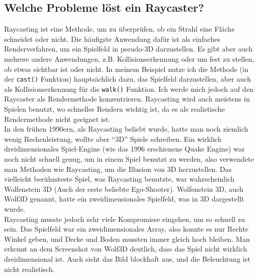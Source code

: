 \documentclass[a4paper,12pt]{report}
\begin{document}
\subsection{Welche Probleme löst ein Raycaster?}
Raycasting ist eine Methode, um zu überprüfen, ob ein Strahl eine Fläche schneidet oder nicht. Die häufigste Anwendung dafür ist als einfaches Renderverfahren, um ein Spielfeld in pseudo-3D darzustellen. Es gibt aber auch mehrere andere Anwendungen, z.B. Kollisionserkennung oder um fest zu stellen, ob etwas sichtbar ist oder nicht. In meinem Beispiel nutze ich die Methode (in der \texttt{cast()} Funktion) hauptsächlich dazu, das Spielfeld darzustellen, aber auch als Kollisionserkennung für die \texttt{walk()} Funktion. Ich werde mich jedoch auf den Raycaster als Rendermethode konzentrieren. Raycasting wird auch meistens in Spielen benutzt, wo schnelles Rendern wichtig ist, da es als realistische Rendermethode nicht geeignet ist. \\
In den frühen 1990ern, als Raycasting beliebt wurde, hatte man noch ziemlich wenig Rechenleistung, wollte aber ``3D'' Spiele schreiben. Ein wirklich dreidimensionales Spiel-Engine (wie das 1996 erschienene Quake Engine) war noch nicht schnell genug, um in einem Spiel benutzt zu werden, also verwendete man Methoden wie Raycasting, um die Illusion von 3D herzustellen. Das vielleicht berühmteste Spiel, was Raycasting benutzte, war wahrscheinlich Wolfenstein 3D (Auch der erste beliebte Ego-Shooter). Wolfenstein 3D, auch Wolf3D genannt, hatte ein zweidimensionales Spielfeld, was in 3D dargestellt wurde. \\
Raycasting musste jedoch sehr viele Kompromisse eingehen, um so schnell zu sein. Das Spielfeld war ein zweidimensionales Array, also konnte es nur Rechte Winkel geben, und Decke und Boden mussten immer gleich hoch bleiben. Man erkennt an dem Screenshot von Wolf3D deutlich, dass das Spiel nicht wirklich dreidimensional ist. Auch sieht das Bild blockhaft aus, und die Beleuchtung ist nicht realistisch.
\end{document}
